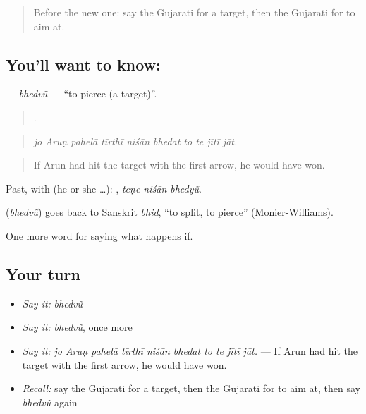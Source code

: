 \label{lesson:GU-C550-bhedvu}



\begin{quote}
Before the new one: say the Gujarati for a target, then the Gujarati for to aim at.
\end{quote}

\subsection*{You'll want to know: }
\textbf{} — \emph{bhedvũ} — \textquotedblleft{}to pierce (a target)\textquotedblright{}.

\begin{quote}
         .
\end{quote}

\begin{quote}
\emph{jo Aruṇ pahelā tīrthī niśān bhedat to te jītī jāt.}
\end{quote}

\begin{quote}
If Arun had hit the target with the first arrow, he would have won.
\end{quote}

Past, with  (he or she …):   , \emph{teṇe niśān bhedyũ}.

\begin{cousinweb}
\textbf{} (\emph{bhedvũ}) goes back to Sanskrit \emph{bhid}, \textquotedblleft{}to split, to pierce\textquotedblright{} (Monier-Williams).
\end{cousinweb}

\begin{grammarlens}[title={What you've built}]
One more word for saying what happens if.
\end{grammarlens}

\subsection*{Your turn}
\begin{itemize}
\raggedright
  \item \emph{Say it:} \emph{bhedvũ}
  \item \emph{Say it:} \emph{bhedvũ}, once more
  \item \emph{Say it:} \emph{jo Aruṇ pahelā tīrthī niśān bhedat to te jītī jāt.} — If Arun had hit the target with the first arrow, he would have won.
  \item \emph{Recall:} say the Gujarati for a target, then the Gujarati for to aim at, then say \emph{bhedvũ} again
\end{itemize}

